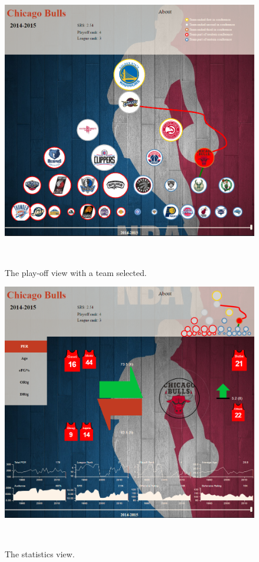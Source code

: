 \documentclass[chi_draft]{sigchi}
\begin{document}
\begin{figure}
\centering
  \includegraphics[width=1.0\columnwidth]{figures/playoffviewteamselected}
  \caption{The play-off view with a team selected.}~\label{fig:playoffviewteam}
\end{figure}

\begin{figure}
\centering
  \includegraphics[width=1.0\columnwidth]{figures/statisticsview}
  \caption{The statistics view.}~\label{fig:statisticsview}
\end{figure}
\end{document}
